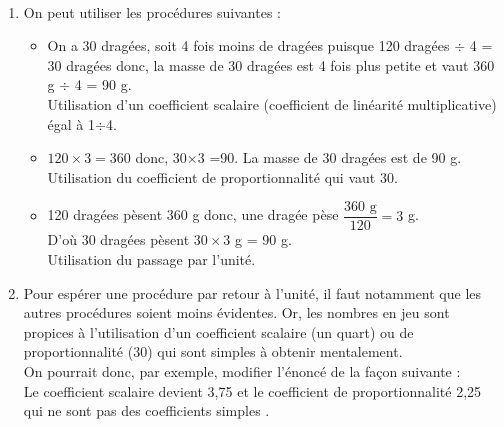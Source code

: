 \ \\ [-5mm]
\begin{enumerate}
   \item On peut utiliser les procédures suivantes :
   \begin{itemize}
      \item On a 30 dragées, soit 4 fois moins de dragées puisque 120 dragées $\div$ 4 = 30 dragées donc, la masse de 30 dragées est 4 fois plus petite et vaut 360 g $\div$ 4 = 90 g. \\
      Utilisation d'un coefficient scalaire (coefficient de linéarité multiplicative) égal à 1$\div$4.
      \item $120\times3 =360$ donc, 30$\times$3 =90. La masse de 30 dragées est de 90 g. \\
      Utilisation du coefficient de proportionnalité qui vaut 30.
      \smallskip
      \item 120 dragées pèsent 360 g donc, une dragée pèse $\dfrac{360\text{ g}}{120} =3$ g. \\
      D'où 30 dragées pèsent $30\times3$ g = 90 g. \\
      Utilisation du passage par l'unité.
   \end{itemize}
   \item Pour \og espérer \fg{} une procédure par retour à l'unité, il faut notamment que les autres procédures soient moins évidentes. Or, les nombres en jeu sont propices à l'utilisation d'un coefficient scalaire (un quart) ou de proportionnalité (30) qui sont simples à obtenir mentalement. \\
   On pourrait donc, par exemple, modifier l'énoncé de la façon suivante :
   \medskip
    \\
   \medskip
   Le coefficient scalaire devient 3,75 et le coefficient de proportionnalité 2,25 qui ne sont pas des coefficients \og simples \fg.
\end{enumerate}
